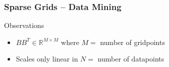 \begin{frame}
  \frametitle{Sparse Grids -- Data Mining}
  \topline
  \vspace{-10px}
  \begin{block}{Observations}
    \begin{itemize}
    \item $ BB^T \in \mathbb{R}^{M \times M}$ where $M =$ number of gridpoints
    \item Scales only linear in $N =$ number of datapoints
    \end{itemize}
  \end{block}
\end{frame}

